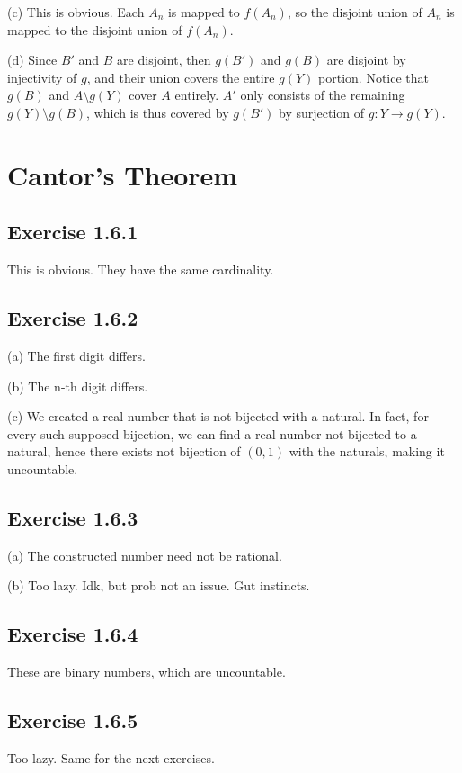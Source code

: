 \documentclass{book}
\begin{document}
\noindent
(c)
This is obvious. Each $A_n$ is mapped to $f(A_n)$, so the disjoint union of $A_n$ is mapped to the disjoint union of $f(A_n)$.

\noindent
(d)
Since $B'$ and $B$ are disjoint, then $g(B')$ and $g(B)$ are disjoint by injectivity of $g$, and their union covers the entire $g(Y)$ portion. Notice that $g(B)$ and $A \setminus g(Y)$ cover $A$ entirely. $A'$ only consists of the remaining $g(Y) \setminus g(B)$, which is thus covered by $g(B')$ by surjection of $g: Y \rightarrow g(Y)$.

\section{Cantor's Theorem}

\subsection*{Exercise 1.6.1}
This is obvious. They have the same cardinality.

\subsection*{Exercise 1.6.2}
(a)
The first digit differs.

\noindent
(b)
The n-th digit differs.

\noindent
(c)
We created a real number that is not bijected with a natural. In fact, for every such supposed bijection, we can find a real number not bijected to a natural, hence there exists not bijection of $(0, 1)$ with the naturals, making it uncountable.

\subsection*{Exercise 1.6.3}
(a)
The constructed number need not be rational.

\noindent
(b)
Too lazy. Idk, but prob not an issue. Gut instincts.

\subsection*{Exercise 1.6.4}
These are binary numbers, which are uncountable.

\subsection*{Exercise 1.6.5}
Too lazy. Same for the next exercises.
\end{document}
